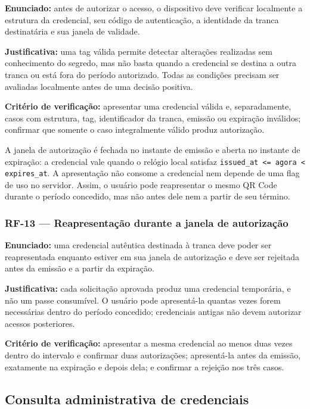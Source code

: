 \textbf{Enunciado:} antes de autorizar o acesso, o dispositivo deve verificar localmente a estrutura da credencial, seu código de autenticação, a identidade da tranca destinatária e sua janela de validade.

\textbf{Justificativa:} uma tag válida permite detectar alterações realizadas sem conhecimento do segredo, mas não basta quando a credencial se destina a outra tranca ou está fora do período autorizado. Todas as condições precisam ser avaliadas localmente antes de uma decisão positiva.

\textbf{Critério de verificação:} apresentar uma credencial válida e, separadamente, casos com estrutura, tag, identificador da tranca, emissão ou expiração inválidos; confirmar que somente o caso integralmente válido produz autorização.

A janela de autorização é fechada no instante de emissão e aberta no instante de expiração: a credencial vale quando o relógio local satisfaz \texttt{issued\_at <= agora < expires\_at}. A apresentação não consome a credencial nem depende de uma flag de uso no servidor. Assim, o usuário pode reapresentar o mesmo QR Code durante o período concedido, mas não antes dele nem a partir de seu término.

\subsubsection*{RF-13 --- Reapresentação durante a janela de autorização}

\textbf{Enunciado:} uma credencial autêntica destinada à tranca deve poder ser reapresentada enquanto estiver em sua janela de autorização e deve ser rejeitada antes da emissão e a partir da expiração.

\textbf{Justificativa:} cada solicitação aprovada produz uma credencial temporária, e não um passe consumível. O usuário pode apresentá-la quantas vezes forem necessárias dentro do período concedido; credenciais antigas não devem autorizar acessos posteriores.

\textbf{Critério de verificação:} apresentar a mesma credencial ao menos duas vezes dentro do intervalo e confirmar duas autorizações; apresentá-la antes da emissão, exatamente na expiração e depois dela; e confirmar a rejeição nos três casos.

\subsection{Consulta administrativa de credenciais}

